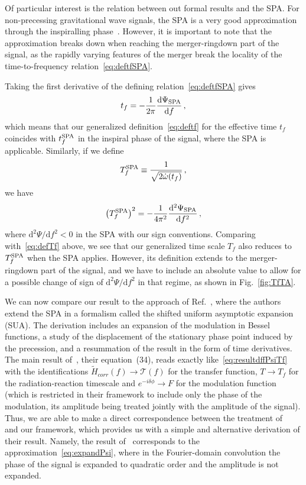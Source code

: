 \documentclass[aps,showpacs,twocolumn,
prd,superscriptaddress,nofootinbib]{revtex4-1}
\newcommand{\be}{\begin{equation}}
\newcommand{\ee}{\end{equation}}
\newcommand\ud{{\mathrm{d}}}
\newcommand\calT{{\mathcal{T}}}
\newcommand{\Tf}{T_{f}}
\begin{document}
Of particular interest is the relation between out formal results and the SPA. For non-precessing gravitational wave signals, the SPA is a very good approximation through the inspiralling phase~\cite{Droz+99}. However, it is important to note that the approximation breaks down when reaching the merger-ringdown part of the signal, as the rapidly varying features of the merger break the locality of the time-to-frequency relation~\eqref{eq:deftfSPA}.  

Taking the first derivative of the defining relation~\eqref{eq:deftfSPA} gives
\be
	t_{f} = -\frac{1}{2\pi} \frac{\ud \Psi_{\rm SPA}}{\ud f} \,,
\ee
which means that our generalized definition~\eqref{eq:deftf} for the effective time $t_{f}$ coincides with $t_{f}^{\rm SPA}$ in the inspiral phase of the signal, where the SPA is applicable. Similarly, if we define
\be
	T_{f}^{\rm SPA} \equiv \frac{1}{\sqrt{2\dot{\omega}(t_{f})}} \,,
\ee
we have
\be
	\left(T_{f}^{\rm SPA} \right)^{2} = -\frac{1}{4\pi^{2}}  \frac{\ud^{2} \Psi_{\rm SPA}}{\ud f^{2}} \,,
\ee
where $\ud^{2}\Psi/\ud f^{2} < 0$ in the SPA with our sign conventions. Comparing with~\eqref{eq:defTf} above, we see that our generalized time scale $\Tf$ also reduces to $T_{f}^{\rm SPA}$ when the SPA applies. However, its definition extends to the merger-ringdown part of the signal, and we have to include an absolute value to allow for a possible change of sign of $\ud^{2}\Psi/\ud f^{2}$ in that regime, as shown in Fig.~\ref{fig:TfTA}.

We can now compare our result to the approach of Ref.~\cite{KCY14}, where the authors extend the SPA in a formalism called the shifted uniform asymptotic expansion (SUA). The derivation includes an expansion of the modulation in Bessel functions, a study of the displacement of the stationary phase point induced by the precession, and a resummation of the result in the form of time derivatives. The main result of~\cite{KCY14}, their equation~(34), reads exactly like~\eqref{eq:resultdffPsiTf} with the identifications $\tilde{H}_{corr}(f)\rightarrow \calT(f)$ for the transfer function, $T\rightarrow \Tf$ for the radiation-reaction timescale and $e^{-i\delta\phi} \rightarrow F$ for the modulation function (which is restricted in their framework to include only the phase of the modulation, its amplitude being treated jointly with the amplitude of the signal). Thus, we are able to make a direct correspondence between the treatment of~\cite{KCY14} and our framework, which provides us with a simple and alternative derivation of their result. Namely, the result of~\cite{KCY14} corresponds to the approximation~\eqref{eq:expandPsi}, where in the Fourier-domain convolution the phase of the signal is expanded to quadratic order and the amplitude is not expanded.
\end{document}
